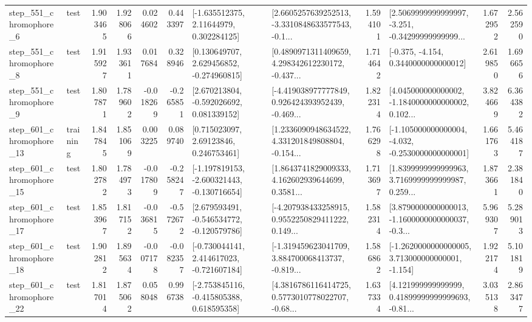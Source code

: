 \begin{tabular}{llrrrrllrlrr}
   step\_551\_chromophore\_6 &      test &      1.903465 &    1.928066 &      0.024602 &  0.443397 &     [-1.635512375, 2.11644979, 0.302284125] &  [2.6605257639252513, -3.3310848633577543, -0.1... &       1.594101 &  [2.5069999999999997, -3.251, -0.34299999999999... &            1.672952 &          2.562590 \\
   step\_551\_chromophore\_8 &      test &      1.915927 &    1.933611 &      0.017684 &  0.328946 &    [0.130649707, 2.629456852, -0.274960815] &  [0.4890971311409659, 4.298342612230172, -0.437... &       1.714642 &               [-0.375, -4.154, 0.3440000000000012] &            2.619850 &          1.696656 \\
   step\_551\_chromophore\_9 &      test &      1.807871 &    1.789602 &     -0.018269 & -0.265851 &    [2.670213804, -0.592026692, 0.081339152] &  [-4.419038977777849, 0.926424393952439, -0.469... &       1.822314 &  [4.045000000000002, -1.1840000000000002, 0.102... &            3.824669 &          6.364382 \\
  step\_601\_chromophore\_13 &  training &      1.847845 &    1.851069 &      0.003225 &  0.089740 &      [0.715023097, 2.69123846, 0.246753461] &  [1.2336090948634522, 4.331201849808804, -0.154... &       1.766298 &  [-1.105000000000004, -4.032, -0.2530000000000001] &            1.661763 &          5.464187 \\
  step\_601\_chromophore\_15 &      test &      1.802782 &    1.784973 &     -0.017809 & -0.258247 &  [-1.197819153, -2.600321443, -0.130716654] &  [1.8643741829009333, 4.162602939644699, 0.3581... &       1.713697 &  [1.8399999999999963, 3.7169999999999987, 0.259... &            1.873661 &          2.381840 \\
  step\_601\_chromophore\_17 &      test &      1.853967 &    1.817152 &     -0.036815 & -0.572672 &   [2.679593491, -0.546534772, -0.120579786] &  [-4.207938433258915, 0.9552250829411222, 0.149... &       1.582314 &  [3.8790000000000013, -1.1600000000000037, -0.3... &            5.969307 &          5.289013 \\
  step\_601\_chromophore\_18 &      test &      1.902812 &    1.895634 &     -0.007178 & -0.082357 &   [-0.730044141, 2.414617023, -0.721607184] &  [-1.319459623041709, 3.884700068413737, -0.819... &       1.586862 &   [-1.2620000000000005, 3.713000000000001, -1.154] &            1.922174 &          5.101819 \\
  step\_601\_chromophore\_22 &      test &      1.817014 &    1.875062 &      0.058048 &  0.996738 &   [-2.753845116, -0.415805388, 0.618595358] &  [4.3816786116414725, 0.5773010778022707, -0.68... &       1.637334 &  [4.121999999999999, 0.41899999999999693, -0.81... &            3.035138 &          2.863477 \\

\end{tabular}
